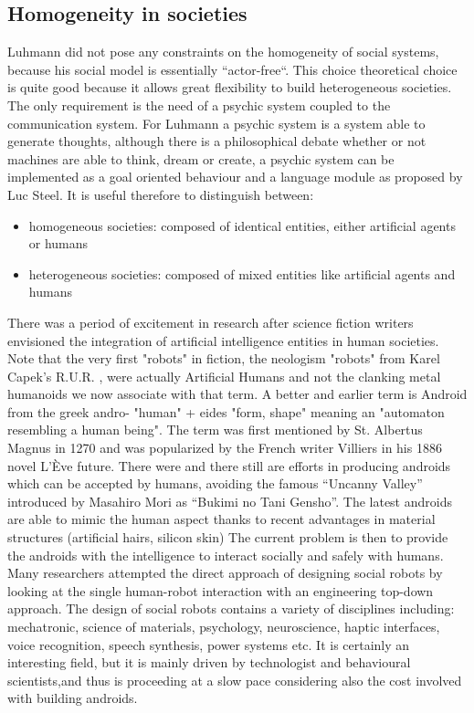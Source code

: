 \subsection{Homogeneity in societies}
Luhmann did not pose any constraints on the homogeneity of social systems,
because his social model is essentially ``actor-free``.
This choice theoretical choice is quite good because it allows great flexibility
to build heterogeneous societies.
The only requirement is the need of a psychic system coupled to the communication
system.
For Luhmann a psychic system is a system able to generate thoughts, although there 
is a philosophical debate whether or not machines are able to 
think, dream or create, a psychic system can be implemented as a goal oriented behaviour
and a language module as proposed by Luc Steel.
It is useful therefore to distinguish between:
\begin{itemize}
 \item homogeneous societies: composed of identical entities, either artificial agents or humans
 \item heterogeneous societies: composed of mixed entities like artificial agents and humans
\end{itemize}
There was a period of excitement in research after science fiction writers envisioned
 the integration of artificial intelligence entities in human societies.
Note that the very first "robots" in fiction, the neologism "robots" from Karel
Capek's R.U.R. \citep{Karel1920:RUR}, were actually Artificial Humans
 and not the clanking metal humanoids we now associate with that term.
A better and earlier term is Android from the greek andro- "human" + eides "form,
shape" meaning an "automaton resembling a human being". The term was first
mentioned by St. Albertus Magnus in 1270 and was popularized by the French writer
 Villiers in his 1886 novel L'\`{E}ve future.
There were and there still are efforts in producing androids which can be accepted
 by humans, avoiding the famous ``Uncanny Valley'' introduced by
Masahiro Mori as ``Bukimi no Tani Gensho''.
The latest androids are able to mimic the human aspect thanks to recent
advantages in material structures (artificial hairs, silicon skin)
The current problem is then to provide the androids with the intelligence to
interact socially and safely with humans.
Many researchers attempted the direct approach of designing social robots by
looking at the single human-robot interaction with an engineering top-down approach.
The design of social robots contains a variety of disciplines including:
mechatronic, science of materials, psychology, neuroscience, haptic interfaces,
voice recognition, speech synthesis, power systems etc.
It is certainly an interesting field, but it is mainly driven by technologist
and behavioural scientists,and thus is proceeding at a slow pace considering 
also the cost involved with building androids.

